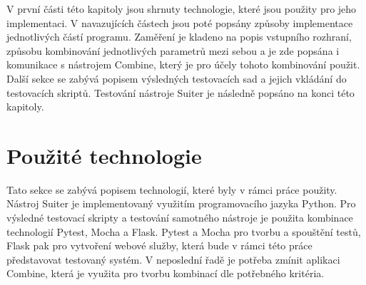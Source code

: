 
V první části této kapitoly jsou shrnuty technologie, které jsou použity pro jeho implementaci. V navazujících částech jsou poté popsány způsoby implementace jednotlivých částí programu. Zaměření je kladeno na popis vstupního rozhraní, způsobu kombinování jednotlivých parametrů mezi sebou a je zde popsána i komunikace s nástrojem Combine, který je pro účely tohoto kombinování použit. Další sekce se zabývá popisem výsledných testovacích sad a jejich vkládání do testovacích skriptů. Testování nástroje Suiter je následně popsáno na konci této kapitoly.


\section{Použité technologie}
\label{sec_Technologie}

Tato sekce se zabývá popisem technologií, které byly v rámci práce použity. Nástroj Suiter je implementovaný využitím programovacího jazyka Python. Pro výsledné testovací skripty a testování samotného nástroje je použita kombinace technologií Pytest, Mocha a Flask. Pytest a Mocha pro tvorbu a spouštění testů, Flask pak pro vytvoření webové služby, která bude v rámci této práce představovat testovaný systém. V neposlední řadě je potřeba zmínit aplikaci Combine, která je využita pro tvorbu kombinací dle potřebného kritéria. 


